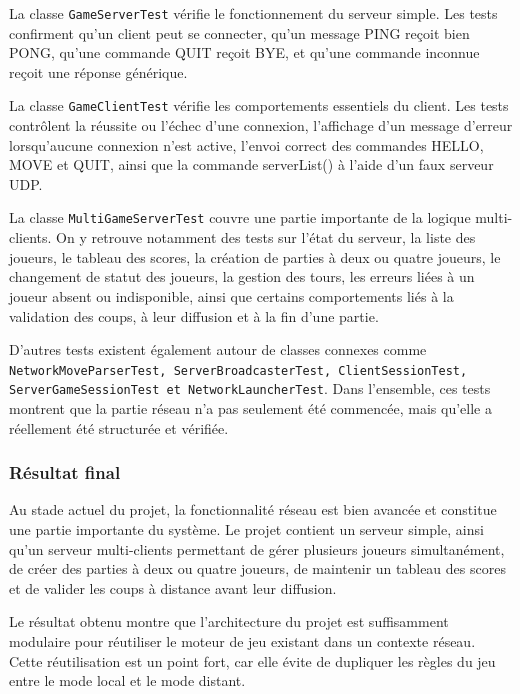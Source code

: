 \documentclass[a4paper]{article}
\begin{document}
La classe \texttt{GameServerTest} vérifie le fonctionnement du serveur simple. Les tests confirment qu’un client peut se connecter, qu’un message PING reçoit bien PONG, qu’une commande QUIT reçoit BYE, et qu’une commande inconnue reçoit une réponse générique.

La classe \texttt{GameClientTest} vérifie les comportements essentiels du client. Les tests contrôlent la réussite ou l’échec d’une connexion, l’affichage d’un message d’erreur lorsqu’aucune connexion n’est active, l’envoi correct des commandes HELLO, MOVE et QUIT, ainsi que la commande serverList() à l’aide d’un faux serveur UDP.

La classe \texttt{MultiGameServerTest} couvre une partie importante de la logique multi-clients. On y retrouve notamment des tests sur l’état du serveur, la liste des joueurs, le tableau des scores, la création de parties à deux ou quatre joueurs, le changement de statut des joueurs, la gestion des tours, les erreurs liées à un joueur absent ou indisponible, ainsi que certains comportements liés à la validation des coups, à leur diffusion et à la fin d’une partie.

D’autres tests existent également autour de classes connexes comme \texttt{NetworkMoveParserTest, ServerBroadcasterTest, ClientSessionTest, ServerGameSessionTest et NetworkLauncherTest}. Dans l’ensemble, ces tests montrent que la partie réseau n’a pas seulement été commencée, mais qu’elle a réellement été structurée et vérifiée.

\subsubsection{Résultat final}


Au stade actuel du projet, la fonctionnalité réseau est bien avancée et constitue une partie importante du système. Le projet contient un serveur simple, ainsi qu’un serveur multi-clients permettant de gérer plusieurs joueurs simultanément, de créer des parties à deux ou quatre joueurs, de maintenir un tableau des scores et de valider les coups à distance avant leur diffusion.

Le résultat obtenu montre que l’architecture du projet est suffisamment modulaire pour réutiliser le moteur de jeu existant dans un contexte réseau. Cette réutilisation est un point fort, car elle évite de dupliquer les règles du jeu entre le mode local et le mode distant.
\end{document}
